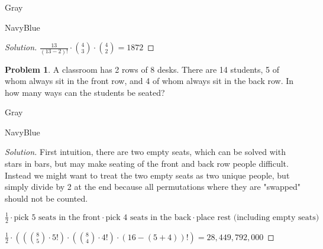 \documentclass[12pt]{amsart}
\newcounter{problem_number}[section]
\theoremstyle{named}
\newenvironment{soln}
{\begin{color}{Gray}\begin{framed}\begin{color}{NavyBlue}\begin{proof}[Solution]
\doublespacing}
{\end{proof}\end{color}\end{framed}\end{color}}
\theoremstyle{definition}
\newtheorem{problem}{Problem}
\begin{document}
\begin{soln}
	\phantom{ }

    $\frac{13}{(13-2)!} \cdot {4 \choose 3} \cdot {4 \choose 2} = 1872$
\end{soln}

\phantom{ }

\phantom{ }

\phantom{ }

\phantom{ }

\phantom{ }

\begin{problem}
	A classroom has 2 rows of 8 desks. There are 14 students, 5 of whom always sit in the front row, and 4 of whom always sit in the back row. In how many ways can the students be seated?
\end{problem}

\begin{soln}
	\phantom{ }

	\noindent First intuition, there are two empty seats, which can be solved
	with stars in bars, but may make seating of the front and back row people
	difficult. Instead we might want to treat the two empty seats as two
	unique people, but simply divide by 2 at the end because all permutations
	where they are "swapped" should not be counted.   





	\noindent $\frac{1}{2} \cdot \text{pick 5 seats in the front} \cdot \text{pick 4 seats in the back}
	\cdot \text{place rest (including empty seats)}$

	\noindent $\frac{1}{2} \cdot (({8 \choose 5}\cdot 5!) \cdot ({8 \choose 4} \cdot 4!)
	\cdot (16-(5+4))!) = 28,449,792,000$
\end{soln}

\end{document}
